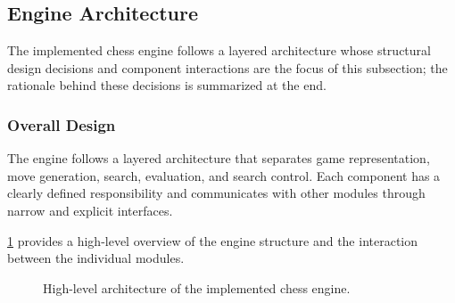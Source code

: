\subsection{Engine Architecture}
\label{sec:architecture}

The implemented chess engine follows a layered architecture whose structural
design decisions and component interactions are the focus of this subsection; the
rationale behind these decisions is summarized at the end.

\subsubsection{Overall Design}

The engine follows a layered architecture that separates game representation,
move generation, search, evaluation, and search control. Each component has a
clearly defined responsibility and communicates with other modules through
narrow and explicit interfaces.

\cref{fig:architecture} provides a high-level overview of the engine structure
and the interaction between the individual modules.

\begin{figure}[ht]
\centering
{}
\caption{High-level architecture of the implemented chess engine.}
\label{fig:architecture}
\end{figure}


